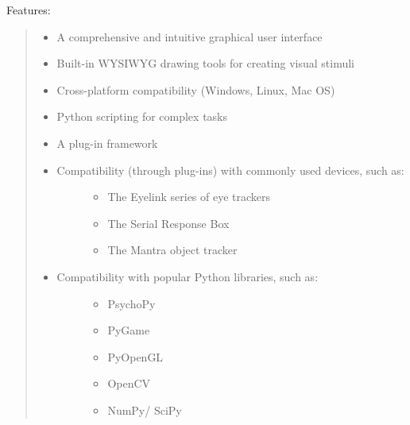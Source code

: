 \documentclass[a4paper,english]{article}
\begin{document}
Features:
%
\begin{quote}
%
\begin{itemize}

\item A comprehensive and intuitive graphical user interface

\item Built-in WYSIWYG drawing tools for creating visual stimuli

\item Cross-platform compatibility (Windows, Linux, Mac OS)

\item Python scripting for complex tasks

\item A plug-in framework

\item %
\begin{description}
\item[{Compatibility (through plug-ins) with commonly used devices, such as:}] \leavevmode %
\begin{itemize}

\item The Eyelink series of eye trackers

\item The Serial Response Box

\item The Mantra object tracker

\end{itemize}

\end{description}

\item %
\begin{description}
\item[{Compatibility with popular Python libraries, such as:}] \leavevmode %
\begin{itemize}

\item PsychoPy

\item PyGame

\item PyOpenGL

\item OpenCV

\item NumPy/ SciPy

\end{itemize}

\end{description}

\end{itemize}

\end{quote}
\end{document}
